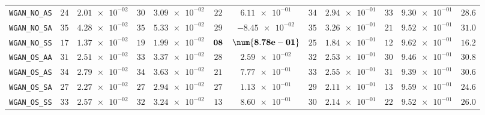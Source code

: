 \begin{xltabular}{\textwidth}{l||cC|cC|cC|cC|cC||c}
	\texttt{WGAN\_NO\_AS} & $ 24$ & $ \num{2.01e-02}$ & $ 30$ & $ \num{3.09e-02}$ & $ 22$ & $ \num{6.11e-01}$ & $ 34$ & $ \num{2.94e-01}$ & $ 33$ & $ \num{9.30e-01}$ & $ 28.6$  \\
	\texttt{WGAN\_NO\_SA} & $ 35$ & $ \num{4.28e-02}$ & $ 35$ & $ \num{5.33e-02}$ & $ 29$ & $ \num{-8.45e-02}$ & $ 35$ & $ \num{3.26e-01}$ & $ 21$ & $ \num{9.52e-01}$ & $ 31.0$  \\
	\texttt{WGAN\_NO\_SS} & $ 17$ & $ \num{1.37e-02}$ & $ 19$ & $ \num{1.99e-02}$ & $\bf 08$ & $\bf \num{8.78e-01}$ & $ 25$ & $ \num{1.84e-01}$ & $ 12$ & $ \num{9.62e-01}$ & $ 16.2$  \\
	\texttt{WGAN\_OS\_AA} & $ 31$ & $ \num{2.51e-02}$ & $ 33$ & $ \num{3.37e-02}$ & $ 28$ & $ \num{2.59e-02}$ & $ 32$ & $ \num{2.53e-01}$ & $ 30$ & $ \num{9.46e-01}$ & $ 30.8$  \\
	\texttt{WGAN\_OS\_AS} & $ 34$ & $ \num{2.79e-02}$ & $ 34$ & $ \num{3.63e-02}$ & $ 21$ & $ \num{7.77e-01}$ & $ 33$ & $ \num{2.55e-01}$ & $ 31$ & $ \num{9.39e-01}$ & $ 30.6$  \\
	\texttt{WGAN\_OS\_SA} & $ 27$ & $ \num{2.27e-02}$ & $ 27$ & $ \num{2.94e-02}$ & $ 27$ & $ \num{1.13e-01}$ & $ 29$ & $ \num{2.11e-01}$ & $ 13$ & $ \num{9.59e-01}$ & $ 24.6$  \\
	\texttt{WGAN\_OS\_SS} & $ 33$ & $ \num{2.57e-02}$ & $ 32$ & $ \num{3.24e-02}$ & $ 13$ & $ \num{8.60e-01}$ & $ 30$ & $ \num{2.14e-01}$ & $ 22$ & $ \num{9.52e-01}$ & $ 26.0$  \\

\end{xltabular}
